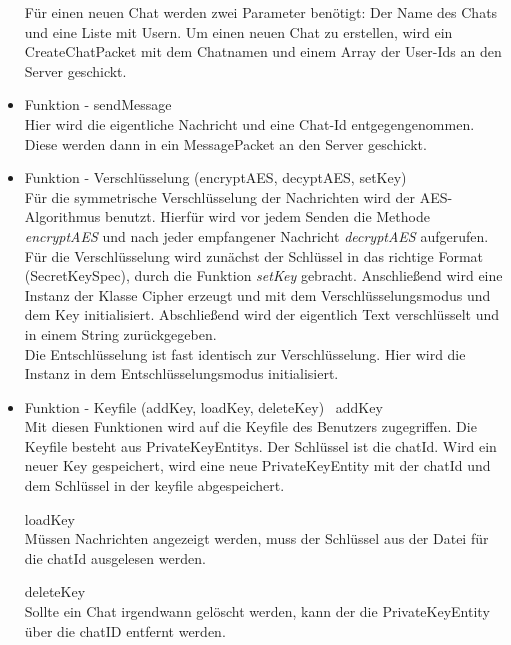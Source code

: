 \begin{itemize}
    Für einen neuen Chat werden zwei Parameter benötigt: Der Name des Chats und eine Liste mit Usern. Um einen neuen Chat zu
    erstellen, wird ein CreateChatPacket mit dem Chatnamen und einem Array der User-Ids an den Server geschickt.
    
    \item Funktion - sendMessage\\
    Hier wird die eigentliche Nachricht und eine Chat-Id entgegengenommen. Diese werden dann in ein MessagePacket an
    den Server geschickt.
    
    \item Funktion - Verschlüsselung (encryptAES, decyptAES, setKey) \\
    Für die symmetrische Verschlüsselung der Nachrichten wird der AES-Algorithmus benutzt. Hierfür wird vor jedem Senden
    die Methode \textit{encryptAES} und nach jeder empfangener Nachricht \textit{decryptAES} aufgerufen.\\
    Für die Verschlüsselung wird zunächst der Schlüssel in das richtige Format (SecretKeySpec), durch die Funktion
    \textit{setKey} gebracht. Anschließend wird eine Instanz der Klasse Cipher erzeugt und mit dem Verschlüsselungsmodus und
    dem Key initialisiert. Abschließend wird der eigentlich Text verschlüsselt und in einem String zurückgegeben. \\
    Die Entschlüsselung ist fast identisch zur Verschlüsselung. Hier wird die Instanz in dem Entschlüsselungsmodus
    initialisiert.
    
    \item Funktion - Keyfile (addKey, loadKey, deleteKey) \
    addKey\\
    Mit diesen Funktionen wird auf die Keyfile des Benutzers zugegriffen. Die Keyfile besteht aus PrivateKeyEntitys.
    Der Schlüssel ist die chatId.
    Wird ein neuer Key gespeichert, wird eine neue PrivateKeyEntity mit der chatId und dem Schlüssel in der keyfile
    abgespeichert.
    
    loadKey\\
    Müssen Nachrichten angezeigt werden, muss der Schlüssel aus der Datei für die chatId ausgelesen werden.
    
    deleteKey \\
    Sollte ein Chat irgendwann gelöscht werden, kann der die PrivateKeyEntity über die chatID entfernt werden. 
    

\end{itemize}
